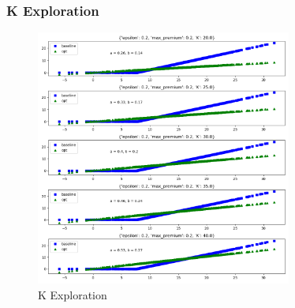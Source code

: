 \documentclass[11pt]{article}
\begin{document}

        \FloatBarrier

        \subsubsection*{K Exploration}
        \begin{figure}[H]
            \centering
            \caption{K Exploration}
            \includegraphics[width=0.75\textwidth]{../../output/figures/CVaR3/K_exploration.png}
        \end{figure}


        \FloatBarrier
\end{document}
